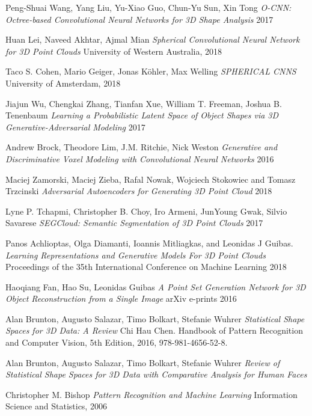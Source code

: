 \begin{thebibliography}{00}
 Peng-Shuai Wang, Yang Liu, Yu-Xiao Guo, Chun-Yu Sun, Xin Tong
\emph{O-CNN: Octree-based Convolutional Neural Networks for 3D Shape Analysis} 2017

 Huan Lei, Naveed Akhtar, Ajmal Mian
\emph{Spherical Convolutional Neural Network for 3D Point Clouds} University of Western Australia, 2018

 Taco S. Cohen, Mario Geiger, Jonas Köhler, Max Welling
\emph{SPHERICAL CNNS} University of Amsterdam, 2018

 Jiajun Wu, Chengkai Zhang, Tianfan Xue, William T. Freeman, Joshua B. Tenenbaum
\emph{Learning a Probabilistic Latent Space of Object Shapes via 3D Generative-Adversarial Modeling} 2017

 Andrew Brock, Theodore Lim, J.M. Ritchie, Nick Weston
\emph{Generative and Discriminative Voxel Modeling with Convolutional Neural Networks} 2016

 Maciej Zamorski, Maciej Zieba, Rafal Nowak, Wojciech Stokowiec and Tomasz Trzcinski
\emph{Adversarial Autoencoders for Generating 3D Point Cloud} 2018

 Lyne P. Tchapmi, Christopher B. Choy, Iro Armeni, JunYoung Gwak, Silvio Savarese
\emph{SEGCloud: Semantic Segmentation of 3D Point Clouds} 2017

 Panos Achlioptas, Olga Diamanti, Ioannis Mitliagkas, and Leonidas J Guibas.
\emph{Learning Representations and Generative Models For 3D Point Clouds} Proceedings
of the 35th International Conference on Machine Learning 2018

 Haoqiang Fan, Hao Su, Leonidas Guibas
\emph{A Point Set Generation Network for 3D Object Reconstruction from a Single Image} arXiv e-prints 2016

 Alan Brunton, Augusto Salazar, Timo Bolkart, Stefanie Wuhrer
\emph{Statistical Shape Spaces for 3D Data: A Review} Chi Hau Chen. Handbook of Pattern Recognition and Computer Vision, 5th Edition, 2016, 978-981-4656-52-8. 

 Alan Brunton, Augusto Salazar, Timo Bolkart, Stefanie Wuhrer
\emph{Review of Statistical Shape Spaces for 3D Data with Comparative Analysis for Human Faces}

 Christopher M. Bishop
\emph{Pattern Recognition and Machine Learning} Information Science and Statistics, 2006



\end{thebibliography}
